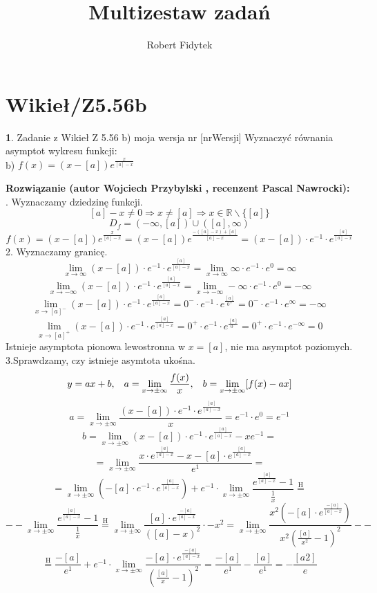 \documentclass[12pt, a4paper]{article}
\title{Multizestaw zadań}
\author{Robert Fidytek}
\date{}
\theoremstyle{definition} %
\newtheorem{zad}{}
\newcommand{\kategoria}[1]{\section{#1}} %
\newcommand{\zadStart}[1]{\begin{zad}#1\newline} %
\newcommand{\zadStop}{\end{zad}}   %
\newcommand{\rozwStart}[2]{\noindent \textbf{Rozwiązanie (autor #1 , recenzent #2): }\newline} %
\begin{document}
\maketitle


\kategoria{Wikieł/Z5.56b}
\zadStart{Zadanie z Wikieł Z 5.56 b) moja wersja nr [nrWersji]}
Wyznaczyć równania asymptot wykresu funkcji:\\
b) $f(x)=(x-[a])e^{\frac{x}{[a]-x}}$
\zadStop
\rozwStart{Wojciech Przybylski}{Pascal Nawrocki}
1. Wyznaczamy dziedzinę funkcji.
$$[a]-x\neq0 \Rightarrow x\neq[a] \Rightarrow x\in\mathbb{R}\backslash\{[a]\}$$
$$D_{f}=(-\infty,[a])\cup([a],\infty)$$
$$
f(x)=(x-[a])e^{\frac{x}{[a]-x}}=(x-[a])e^{\frac{-([a]-x)+[a]}{[a]-x}}=(x-[a])\cdot e^{-1}\cdot e^{\frac{[a]}{[a]-x}}
$$
2. Wyznaczamy granicę. 
$$\lim_{x\to\infty}(x-[a])\cdot e^{-1}\cdot e^{\frac{[a]}{[a]-x}}=\lim_{x\to\infty}\infty\cdot e^{-1}\cdot e^{0}=\infty$$
$$\lim_{x\to-\infty}(x-[a])\cdot e^{-1}\cdot e^{\frac{[a]}{[a]-x}}=\lim_{x\to-\infty}-\infty\cdot e^{-1}\cdot e^{0}=-\infty$$
$$\lim_{x\to[a]^{-}}(x-[a])\cdot e^{-1}\cdot e^{\frac{[a]}{[a]-x}}=0^{-}\cdot e^{-1}\cdot e^{\frac{[a]}{0^{+}}}=0^{-}\cdot e^{-1}\cdot e^{\infty}=-\infty$$
$$\lim_{x\to[a]^{+}}(x-[a])\cdot e^{-1}\cdot e^{\frac{[a]}{[a]-x}}=0^{+}\cdot e^{-1}\cdot e^{\frac{[a]}{0^{-}}}=0^{+}\cdot e^{-1}\cdot e^{-\infty}=0$$
Istnieje asymptota pionowa lewostronna w $x=[a]$, nie ma asymptot poziomych.\\
3.Sprawdzamy, czy istnieje asymtota ukośna.
$$y=ax+b,\hspace{3mm}a=\lim_{x\to\pm\infty}\frac{f(x)}{x},\hspace{3mm}b=\lim_{x\to\pm\infty}[f(x)-ax]$$
$$a=\lim_{x\to\pm\infty}\frac{(x-[a])\cdot e^{-1}\cdot e^{\frac{[a]}{[a]-x}}}{x}=e^{-1}\cdot e^{0}=e^{-1}$$
$$b=\lim_{x\to\pm\infty}(x-[a])\cdot e^{-1}\cdot e^{\frac{[a]}{[a]-x}}-xe^{-1}=$$
$$=\lim_{x\to\pm\infty}\frac{x\cdot e^{\frac{[a]}{[a]-x}}-x-[a]\cdot e^{\frac{[a]}{[a]-x}}}{e^{1}}=$$
$$=\lim_{x\to\pm\infty}(-[a]\cdot e^{-1}\cdot e^{\frac{[a]}{[a]-x}})+e^{-1}\cdot\lim_{x\to\pm\infty}\frac{e^{\frac{[a]}{[a]-x}}-1}{\frac{1}{x}}\stackrel{\text{H}}{=}$$
$$--\lim_{x\to\pm\infty}\frac{e^{\frac{[a]}{[a]-x}}-1}{\frac{1}{x}}\stackrel{\text{H}}{=}\lim_{x\to\pm\infty}\frac{[a]\cdot e^{\frac{-[a]}{[a]-x}}}{([a]-x)^{2}}\cdot-x^{2}=\lim_{x\to\pm\infty}\frac{x^{2}(-[a]\cdot e^{\frac{-[a]}{[a]-x}})}{x^{2}(\frac{[a]}{x^{2}}-1)^{2}}--$$
$$\stackrel{\text{H}}{=}\frac{-[a]}{e^{1}}+e^{-1}\cdot\lim_{x\to\pm\infty}\frac{-[a]\cdot e^{\frac{-[a]}{[a]-x}}}{(\frac{[a]}{x}-1)^{2}}=\frac{-[a]}{e^{1}}-\frac{[a]}{e^{1}}=-\frac{[a2]}{e}$$
\end{document}
